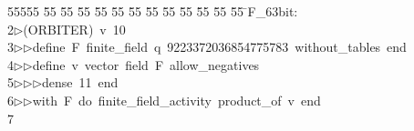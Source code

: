 %
%
\begin{tabbing}
55555 \= 55 \= 55 \= 55 \= 55 \= 55 \= 55 \= 55 \= 55 \= 55 \= 55 \= 55 \= 55 \= \>F\_63bit:\\[0pt]
2\>$\triangleright$\>(ORBITER)\ v\ 10\ \\[0pt]
3\>$\triangleright$\>$\triangleright$\>define\ F\ finite\_field\ q\ 9223372036854775783\ without\_tables\ end\ \\[0pt]
4\>$\triangleright$\>$\triangleright$\>define\ v\ vector\ field\ F\ allow\_negatives\ \\[0pt]
5\>$\triangleright$\>$\triangleright$\>$\triangleright$\>dense\ 11\ end\ \\[0pt]
6\>$\triangleright$\>$\triangleright$\>with\ F\ do\ finite\_field\_activity\ product\_of\ v\ end\\[0pt]
7\>\end{tabbing}
